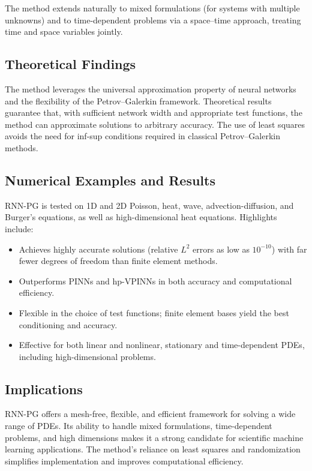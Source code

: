 \documentclass[11pt]{article}
\begin{document}
The method extends naturally to mixed formulations (for systems with multiple unknowns) and to time-dependent problems via a space–time approach, treating time and space variables jointly.

\subsection{Theoretical Findings}
The method leverages the universal approximation property of neural networks and the flexibility of the Petrov–Galerkin framework. Theoretical results guarantee that, with sufficient network width and appropriate test functions, the method can approximate solutions to arbitrary accuracy. The use of least squares avoids the need for inf-sup conditions required in classical Petrov–Galerkin methods.

\subsection{Numerical Examples and Results}
RNN-PG is tested on 1D and 2D Poisson, heat, wave, advection-diffusion, and Burger's equations, as well as high-dimensional heat equations. Highlights include:
\begin{itemize}
    \item Achieves highly accurate solutions (relative $L^2$ errors as low as $10^{-10}$) with far fewer degrees of freedom than finite element methods.
    \item Outperforms PINNs and hp-VPINNs in both accuracy and computational efficiency.
    \item Flexible in the choice of test functions; finite element bases yield the best conditioning and accuracy.
    \item Effective for both linear and nonlinear, stationary and time-dependent PDEs, including high-dimensional problems.
\end{itemize}

\subsection{Implications}
RNN-PG offers a mesh-free, flexible, and efficient framework for solving a wide range of PDEs. Its ability to handle mixed formulations, time-dependent problems, and high dimensions makes it a strong candidate for scientific machine learning applications. The method's reliance on least squares and randomization simplifies implementation and improves computational efficiency.
\end{document}
